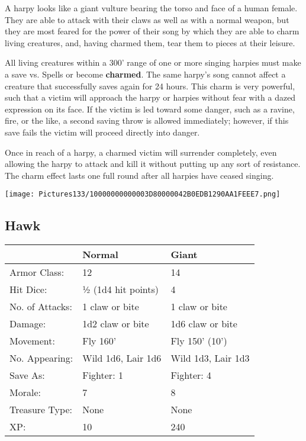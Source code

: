 \documentclass[a4paper,twoside,openany,10pt]{book}
\begin{document}
\begin{multicols}{2}
A harpy looks like a giant vulture bearing the torso and face of a human female. They are able to attack with their claws as well as with a normal weapon, but they are most feared for the power of their song by which they are able to charm living creatures, and, having charmed them, tear them to pieces at their leisure.

All living creatures within a 300' range of one or more singing harpies must make a save vs. Spells or become \textbf{charmed}. The same harpy's song cannot affect a creature that successfully saves again for 24 hours. This charm is very powerful, such that a victim will approach the harpy or harpies without fear with a dazed expression on its face. If the victim is led toward some danger, such as a ravine, fire, or the like, a second saving throw is allowed immediately; however, if this save fails the victim will proceed directly into danger.

Once in reach of a harpy, a charmed victim will surrender completely, even allowing the harpy to attack and kill it without putting up any sort of resistance. The charm effect lasts one full round after all harpies have ceased singing.

\begin{center}
	\texttt{[image: Pictures133/10000000000003D80000042B0EDB1290AA1FEEE7.png]}
\end{center}

\subsection*{Hawk}\label{hawk}

\begin{tabularx}{0.48\textwidth}{@{}llX@{}}
& Normal & Giant \\\hline
Armor Class: & 12 & 14 \\\hline
Hit Dice: & ½ (1d4 hit points) & 4 \\\hline
No. of Attacks: & 1 claw or bite & 1 claw or bite \\\hline
Damage: & 1d2 claw or bite & 1d6 claw or bite \\\hline
Movement: & Fly 160' & Fly 150'
(10') \\\hline
No. Appearing: & Wild 1d6, Lair 1d6 & Wild 1d3, Lair 1d3 \\\hline
Save As: & Fighter: 1 & Fighter: 4 \\\hline
Morale: & 7 & 8 \\\hline
Treasure Type: & None & None \\\hline
XP: & 10 & 240 \\\hline
\end{tabularx}\medskip


\end{multicols}
\end{document}

